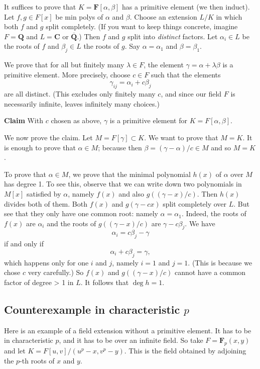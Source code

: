 \documentclass[11pt]{article}
\begin{document}
It suffices to prove that \(K = \mathbf{F}[\alpha, \beta]\) has a primitive element (we then induct).
Let \(f,g \in F[x]\) be min polys of \(\alpha\) and \(\beta\).
Choose an extension \(L / K\) in which both \(f\) and \(g\) split completely.
(If you want to keep things concrete, imagine \(F = \mathbf{Q}\) and \(L = \mathbf{C}\) or \(\overline{\mathbf{Q}}\).)
Then \(f\) and \(g\) split into \emph{distinct} factors.
Let \(\alpha_i \in L\) be the roots of \(f\) and \(\beta_j \in L\) the roots of \(g\).
Say \(\alpha = \alpha_1\) and \(\beta = \beta_1\).

We prove that for all but finitely many \(\lambda \in F\), the element \(\gamma = \alpha + \lambda \beta\) is a primitive element.
More precisely, choose \(c \in F\) such that the elements
\[ \gamma_{ij} = \alpha_i + c \beta_j\]
are all distinct.
(This excludes only  finitely many \(c\), and since our field \(F\) is necessarily infinite, leaves infinitely many choices.)

\textbf{\textbf{Claim}} With \(c\) chosen as above, \(\gamma\) is a primitive element for \(K = F[\alpha,\beta]\).

We now prove the claim.
Let \(M = F[\gamma] \subset K\).
We want to prove that \(M = K\).
It is enough to prove that \(\alpha \in M\); because then \(\beta = (\gamma - \alpha)/c \in M\) and so \(M = K\).

To prove that \(\alpha \in M\), we prove that the minimal polynomial \(h(x)\) of \(\alpha\) over \(M\) has degree 1.
To see this, observe that we can write down two polynomials in \(M[x]\) satisfied by \(\alpha\), namely \(f(x)\) and also \(g((\gamma - x)/c)\).
Then \(h(x)\) divides both of them.
Both \(f(x)\) and \(g(\gamma - cx)\) split completely over \(L\).
But see that they only have one common root: namely \(\alpha = \alpha_1\).
Indeed, the roots of \(f(x)\) are \(\alpha_i\) and the roots of \(g((\gamma - x)/c)\) are \(\gamma - c \beta_{j}\).
We have
\[ \alpha_i = c\beta_j - \gamma\]
if and only if
\[  \alpha_i + c\beta_j = \gamma,\]
which happens only for one \(i\) and \(j\), namely \(i = 1\) and \(j = 1\).
(This is because we chose \(c\) very carefully.)
So \(f(x)\) and \(g((\gamma - x)/c)\) cannot have a common factor of degree > 1 in \(L\).
It follows that \(\deg h = 1\).
\subsection{Counterexample in characteristic \(p\)}
\label{sec:orgf07071f}
Here is an example of a field extension without a primitive element.
It has to be in characteristic \(p\), and it has to be over an infinite field.
So take \(F = \mathbf{F}_p(x,y)\) and let \(K = F[u,v]/(u^p-x, v^p-y)\).
This is the field obtained by adjoining the \(p\)-th roots of \(x\) and \(y\).
\end{document}
